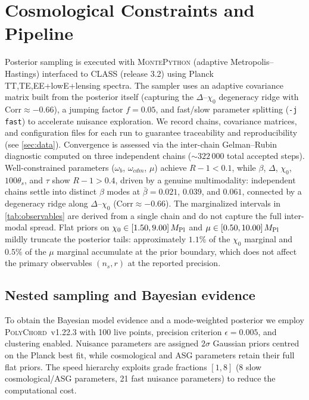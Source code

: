 \documentclass[11pt,a4paper]{article}
\begin{document}
\section{Cosmological Constraints and Pipeline}
\label{sec:constraints}
Posterior sampling is executed with \textsc{MontePython} (adaptive Metropolis--Hastings) interfaced to \textsc{CLASS} (release 3.2) using Planck TT,TE,EE+lowE+lensing spectra. The sampler uses an adaptive covariance matrix built from the posterior itself (capturing the $\Delta$--$\chi_0$ degeneracy ridge with $\mathrm{Corr}\approx-0.66$), a jumping factor $f=0.05$, and fast/slow parameter splitting (\texttt{-j fast}) to accelerate nuisance exploration. We record chains, covariance matrices, and configuration files for each run to guarantee traceability and reproducibility (see \cref{sec:data}). Convergence is assessed via the inter-chain Gelman--Rubin diagnostic computed on three independent chains (${\sim}322\,000$ total accepted steps). Well-constrained parameters ($\omega_b$, $\omega_{cdm}$, $\mu$) achieve $R{-}1<0.1$, while $\beta$, $\Delta$, $\chi_0$, $100\theta_s$, and $\tau$ show $R{-}1>0.4$, driven by a genuine multimodality: independent chains settle into distinct $\beta$ modes at $\bar\beta=0.021$, $0.039$, and $0.061$, connected by a degeneracy ridge along $\Delta$--$\chi_0$ ($\mathrm{Corr}\approx-0.66$). The marginalized intervals in \cref{tab:observables} are derived from a single chain and do not capture the full inter-modal spread. Flat priors on $\chi_0\in[1.50,9.00]\,M_{\rm Pl}$ and $\mu\in[0.50,10.00]\,M_{\rm Pl}$ mildly truncate the posterior tails: approximately $1.1\%$ of the $\chi_0$ marginal and $0.5\%$ of the $\mu$ marginal accumulate at the prior boundary, which does not affect the primary observables $(n_s,r)$ at the reported precision.

\subsection{Nested sampling and Bayesian evidence}
\label{sec:evidence}
To obtain the Bayesian model evidence and a mode-weighted posterior we employ \textsc{PolyChord}~v1.22.3 \cite{Handley2015a,Handley2015b} with 100 live points, precision criterion $\epsilon=0.005$, and clustering enabled. Nuisance parameters are assigned $2\sigma$ Gaussian priors centred on the Planck best fit, while cosmological and ASG parameters retain their full flat priors. The speed hierarchy exploits grade fractions $[1,8]$ (8 slow cosmological/ASG parameters, 21 fast nuisance parameters) to reduce the computational cost.
\end{document}
